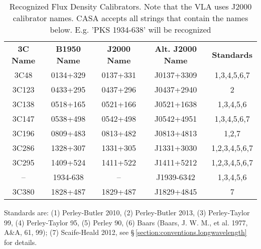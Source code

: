 \vspace{5mm}
\begin{table}[h!]
\caption{Recognized Flux Density Calibrators. Note that the VLA uses
J2000 calibrator names. CASA accepts all strings that contain the
names below. E.g. 'PKS 1934-638' will be recognized
        {\label{table:fluxcal-table}}}
\begin{center}
\begin{tabular}{|ccccc|} \hline
 {\bf 3C Name}  & {\bf B1950 Name}& {\bf J2000 Name} & {\bf Alt. J2000
   Name} & {\bf Standards}\\
3C48  &  0134+329 &  0137+331 &  J0137+3309 & 1,3,4,5,6,7  \\
3C123 &  0433+295 &  0437+296 &  J0437+2940 &      2 \\
3C138 &  0518+165 &  0521+166 &  J0521+1638 &      1,3,4,5,6\\
3C147 &  0538+498 &  0542+498 &  J0542+4951 &      1,3,4,5,6,7\\
3C196 &  0809+483 &  0813+482 &  J0813+4813 &      1,2,7 \\
3C286 &  1328+307 &  1331+305 &  J1331+3030 &      1,2,3,4,5,6,7\\
3C295 &  1409+524 &  1411+522 &  J1411+5212 &      1,2,3,4,5,6,7\\
 --   &  1934-638 &    --     &  J1939-6342 &      1,3,4,5,6\\
3C380&   1828+487&   1829+487 &  J1829+4845&       7\\
\hline
\end{tabular}
\end{center}
Standards are: (1) Perley-Butler 2010, (2) Perley-Butler 2013, (3) Perley-Taylor 99, (4)
Perley-Taylor 95, (5) Perley 90, (6) Baars (Baars, J. W. M., et
al. 1977, A\&A, 61, 99); (7) Scaife-Heald 2012, see
\S\,\ref{section:conventions.longwavelength} for details.
\end{table}




